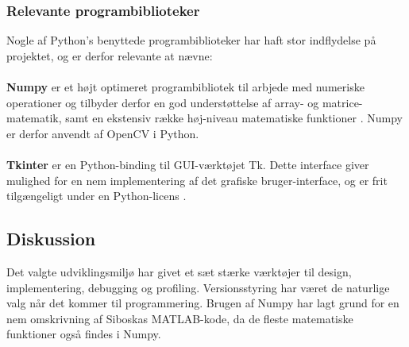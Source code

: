\documentclass[rapport.tex]{subfiles}
\begin{document}
	\subsubsection{Relevante programbiblioteker}
	Nogle af Python's benyttede programbiblioteker har haft stor indflydelse på projektet, og er derfor relevante at nævne: \\\\	
	\textbf{Numpy} er et højt optimeret programbibliotek til arbjede med numeriske operationer og tilbyder derfor en god understøttelse af array- og matrice-matematik, samt en ekstensiv række høj-niveau matematiske funktioner \cite{Numpy}. Numpy er derfor anvendt af OpenCV i Python. \\\\
	\textbf{Tkinter} er en Python-binding til GUI-værktøjet Tk. Dette interface giver mulighed for en nem implementering af det grafiske bruger-interface, og er frit tilgængeligt under en Python-licens \cite{Tkinter}.

	\subsection{Diskussion}
	Det valgte udviklingsmiljø har givet et sæt stærke værktøjer til design, implementering, debugging og profiling. Versionsstyring har været de naturlige valg når det kommer til programmering. 
	Brugen af Numpy har lagt grund for en nem omskrivning af Siboskas MATLAB-kode, da de fleste matematiske funktioner også findes i Numpy. 
		
\end{document}
